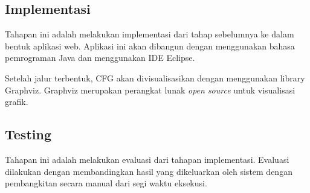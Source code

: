 \subsection*{Implementasi}

Tahapan ini adalah melakukan implementasi dari tahap sebelumnya ke dalam bentuk aplikasi web. Aplikasi ini akan dibangun dengan menggunakan bahasa pemrograman Java dan menggunakan IDE Eclipse. 

Setelah jalur terbentuk, CFG akan divisualisasikan dengan menggunakan library Graphviz. Graphviz merupakan perangkat lunak \textit{open source} untuk visualisasi grafik.

\subsection*{Testing}

Tahapan ini adalah melakukan evaluasi dari tahapan implementasi. Evaluasi dilakukan dengan membandingkan hasil yang dikeluarkan oleh sistem dengan pembangkitan secara manual dari segi waktu eksekusi. 